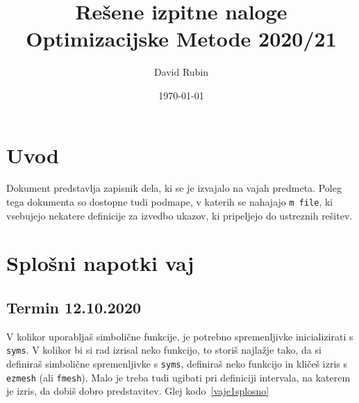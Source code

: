 \documentclass[a4paper,11pt]{article}
\title{Rešene izpitne naloge \\ 
	\large Optimizacijske Metode 2020/21}
\author{David Rubin}
\date{\today}
\begin{document}
\maketitle

\tableofcontents
\newpage


\section{Uvod}

Dokument predstavlja zapisnik dela, ki se je izvajalo na vajah predmeta. Poleg tega dokumenta so dostopne tudi podmape, v katerih se nahajajo \texttt{m file}, ki vsebujejo nekatere definicije za izvedbo ukazov, ki pripeljejo do ustreznih rešitev.

\section{Splošni napotki vaj}

\subsection{Termin 12.10.2020}

V kolikor uporabljaš simbolične funkcije, je potrebno spremenljivke inicializirati s \texttt{syms}. V kolikor bi si rad izrisal neko funkcijo, to storiš najlažje tako, da si definiraš simbolične spremenljivke s \texttt{syms}, definiraš neko funkcijo in kličeš izris s \texttt{ezmesh} (ali \texttt{fmesh}). Malo je treba tudi ugibati pri definiciji intervala, na katerem je izris, da dobiš dobro predstavitev. Glej kodo~\ref{vaje1splosno}


\end{document}
